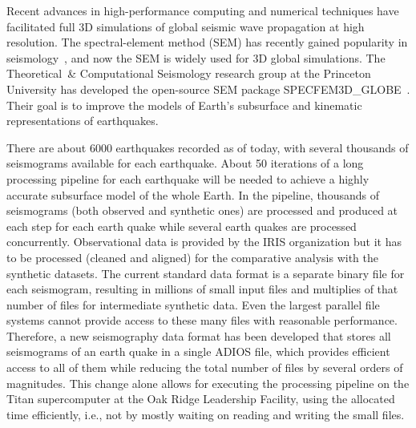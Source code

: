 Recent advances in high-performance computing and numerical techniques have facilitated full 3D
simulations of global seismic wave propagation at high resolution. The spectral-element method (SEM)
has recently gained popularity in seismology~\cite{ADIOS:seismography:tromp2008spectral}, and now the SEM
is widely used for 3D global simulations. The Theoretical~\& Computational Seismology research group
at the Princeton University has developed the open-source SEM package
SPECFEM3D\_GLOBE~\cite{ADIOS:seismography:carrington2008high}. Their goal is to improve the models of
Earth's subsurface and kinematic representations of earthquakes.

There are about 6000 earthquakes recorded as of today, with several thousands of seismograms
available for each earthquake. About 50 iterations of a long processing pipeline for each earthquake
will be needed to achieve a highly accurate subsurface model of the whole Earth. In the pipeline,
thousands of seismograms (both observed and synthetic ones) are processed and produced at each step
for each earth quake while several earth quakes are processed concurrently. Observational data is
provided by the IRIS organization but it has to be processed (cleaned and aligned) for the
comparative analysis with the synthetic datasets. The current standard data format is a separate
binary file for each seismogram, resulting in millions of small input files and multiplies of that
number of files for intermediate synthetic data. Even the largest parallel file systems cannot
provide access to these many files with reasonable performance. Therefore, a new seismography data
format has been developed that stores all seismograms of an earth quake in a single ADIOS file, which
provides efficient access to all of them while reducing the total number of files by several orders
of magnitudes. This change alone allows for executing the processing pipeline on the Titan
supercomputer at the Oak Ridge Leadership Facility, using the allocated time efficiently, i.e., not
by mostly waiting on reading and writing the small files.
 
